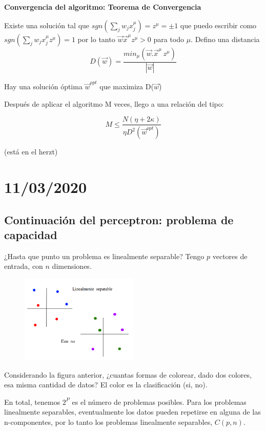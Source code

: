 {\bf Convergencia del algoritmo: Teorema de Convergencia}

Existe una solución tal que $sgn(\sum_j w_jx_j^\mu)=z^{\mu}= \pm 1$ que puedo escribir como $sgn(\sum_j w_jx_j^\mu z^\mu)=1$ por lo tanto $\vec w \vec x^\mu z^\mu > 0$ para todo $\mu$. Defino una distancia 
\begin{equation}
	D(\vec w) = \frac{min_\mu(\vec w . \vec x^\mu \, z^\mu)}{|\vec w|}
\end{equation}

Hay una solución óptima $\vec w ^{opt}$ que maximiza D($\vec w$)

Después de aplicar el algoritmo M veces, llego a una relación del tipo:

\begin{equation}
	M \le \frac{N(\eta + 2\kappa)}{\eta D^2(\vec w ^{opt})}
\end{equation}

(está en el herzt)

\section{11/03/2020}

\subsection{Continuación del perceptron: problema de capacidad}

¿Hasta que punto un problema es linealmente separable? Tengo $p$ vectores de entrada, con $n$ dimensiones. 

\begin{figure}[H]
	\centering
	\includegraphics[width=0.5\textwidth]{5-1.png}
\end{figure}
Considerando la figura anterior, ¿cuantas formas de colorear, dado dos colores, esa misma cantidad de datos? El color es la clasificación (si, no). 

En total, tenemos $2^P$ es el número de problemas posibles. Para los problemas linealmente separables, eventualmente los datos pueden repetirse en alguna de las n-componentes, por lo tanto los problemas linealmente separables, $C(p,n)$.

